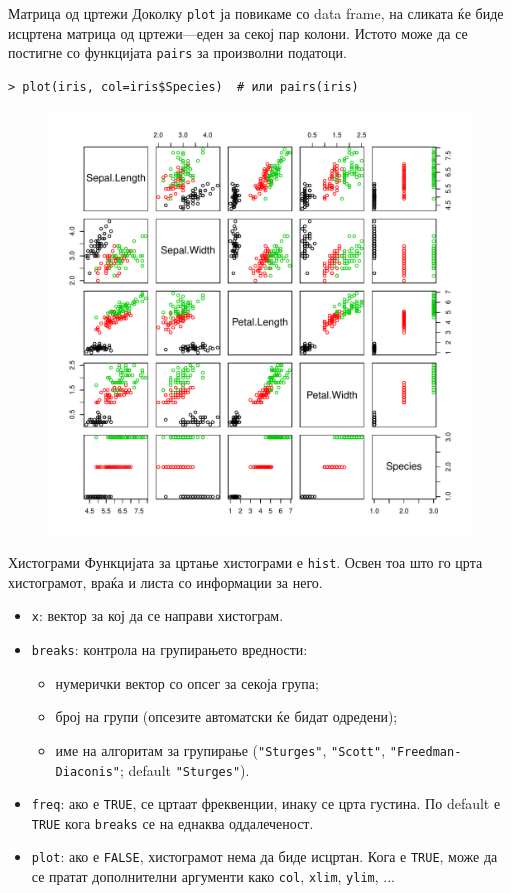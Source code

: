 \documentclass[hyperref={unicode}, xcolor={svgnames, table},
usepdftitle=false]{beamer}
\theoremstyle{remark}
\begin{document}
\begin{frame}[fragile]{Матрица од цртежи}
  Доколку \texttt{plot} ја повикаме со data frame, на сликата ќе биде
  исцртена матрица од цртежи---еден за секој пар колони.  Истото може да се
  постигне со функцијата \texttt{pairs} за произволни податоци.
\begin{verbatim}
> plot(iris, col=iris$Species)  # или pairs(iris)
\end{verbatim}
  \begin{figure}
    \centering
    \includegraphics[width=.45\textwidth]{Plot_Pairs_Iris.pdf}
  \end{figure}
\end{frame}

\begin{frame}{Хистограми}
  Функцијата за цртање хистограми е \texttt{hist}.  Освен тоа што го црта
  хистограмот, враќа и листа со информации за него.
  \begin{itemize}
  \item \texttt{x}: вектор за кој да се направи хистограм.
  \item \texttt{breaks}: контрола на групирањето вредности:
    \begin{itemize}
    \item нумерички вектор со опсег за секоја група;
    \item број на групи (опсезите автоматски ќе бидат одредени);
    \item име на алгоритам за групирање (\texttt{"Sturges"},
      \texttt{"Scott"}, \texttt{"Freedman-Diaconis"}; default
      \texttt{"Sturges"}).
    \end{itemize}
  \item \texttt{freq}: ако е \texttt{TRUE}, се цртаат фреквенции,
    инаку се црта густина.  По default е \texttt{TRUE} кога
    \texttt{breaks} се на еднаква оддалеченост.
  \item \texttt{plot}: ако е \texttt{FALSE}, хистограмот нема да
    биде исцртан.  Кога е \texttt{TRUE}, може да се пратат дополнителни
    аргументи како \texttt{col}, \texttt{xlim},
    \texttt{ylim}, ...
  \end{itemize}
\end{frame}
\end{document}
